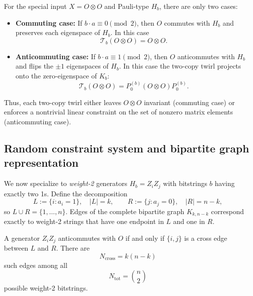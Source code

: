 \documentclass[a4paper,onecolumn,notitlepage,nofootinbib,longbibliography,superscriptaddress, floatfix, pra, aps, 10pt]{revtex4-2}
\begin{document}
For the special input $X = O\otimes O$ and Pauli-type $H_b$, there are only two cases:
\begin{itemize}
  \item \textbf{Commuting case:} If $b\cdot a \equiv 0\pmod 2$, then $O$ commutes with $H_b$ and preserves each eigenspace of $H_b$. In this case
    \begin{equation}
      \mathcal{T}_b(O\otimes O) = O\otimes O.
    \end{equation}
  \item \textbf{Anticommuting case:} If $b\cdot a \equiv 1\pmod 2$, then $O$ anticommutes with $H_b$ and flips the $\pm1$ eigenspaces of $H_b$. In this case the two-copy twirl projects onto the zero-eigenspace of $K_b$:
    \begin{equation}
      \mathcal{T}_b(O\otimes O) = P_0^{(b)}(O\otimes O)P_0^{(b)}.
    \end{equation}
\end{itemize}

Thus, each two-copy twirl either leaves $O\otimes O$ invariant (commuting case) or enforces a nontrivial linear constraint on the set of nonzero matrix elements (anticommuting case).

\subsection{Random constraint system and bipartite graph representation}

We now specialize to \emph{weight-2} generators $H_b=Z_iZ_j$ with bitstrings $b$ having exactly two 1s. Define the decomposition
\begin{equation}
  L := \{i : a_i = 1\},\quad |L| = k, \qquad
  R := \{j : a_j = 0\},\quad |R| = n-k,
\end{equation}
so $L\cup R = \{1,\dots,n\}$. Edges of the complete bipartite graph $K_{k,n-k}$ correspond exactly to weight-2 strings that have one endpoint in $L$ and one in $R$.

A generator $Z_iZ_j$ anticommutes with $O$ if and only if $\{i,j\}$ is a cross edge between $L$ and $R$. There are
\begin{equation}
  N_{\mathrm{cross}} = k(n-k)
\end{equation}
such edges among all
\begin{equation}
  N_{\mathrm{tot}} = \binom{n}{2}
\end{equation}
possible weight-2 bitstrings.
\end{document}

